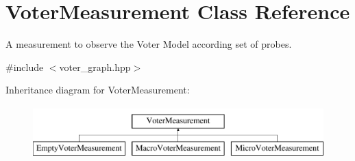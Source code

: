 \hypertarget{class_voter_measurement}{\section{Voter\-Measurement Class Reference}
\label{class_voter_measurement}
}


A measurement to observe the Voter Model according set of probes.  




{\ttfamily \#include $<$voter\-\_\-graph.\-hpp$>$}

Inheritance diagram for Voter\-Measurement\-:\begin{figure}[H]
\begin{center}
\leavevmode
\includegraphics[height=2.000000cm]{class_voter_measurement}
\end{center}
\end{figure}
